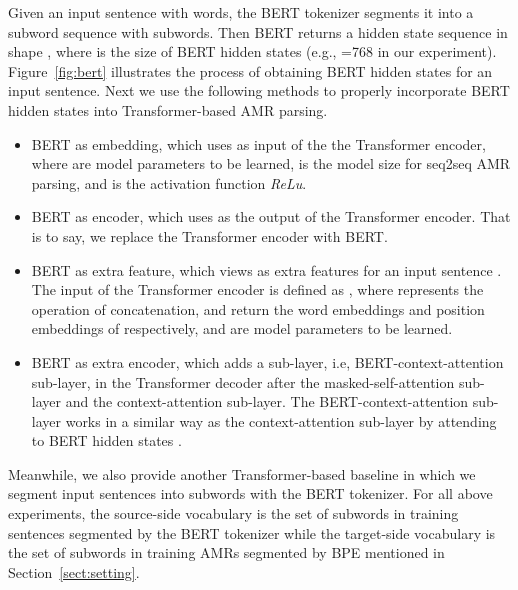 \documentclass[11pt,a4paper]{article}
\begin{document}
Given an input sentence  with  words, the BERT tokenizer segments it into a subword sequence  with  subwords. Then BERT returns a hidden state sequence  in shape , where  is the size of BERT hidden states (e.g., =768 in our experiment). Figure~\ref{fig:bert} illustrates the process of obtaining BERT hidden states for an input sentence. Next we use the following methods to properly incorporate BERT hidden states  into Transformer-based AMR parsing.

\begin{itemize}\item BERT as embedding, which uses  as input of the the Transformer encoder, where  are model parameters to be learned,  is the model size for seq2seq AMR parsing, and  is the activation function \textit{ReLu}.
\item BERT as encoder, which uses  as the output of the Transformer encoder. That is to say, we replace the Transformer encoder with BERT. 
\item BERT as extra feature, which views  as extra features for an input sentence . The input of the Transformer encoder is defined as , where  represents the operation of concatenation,  and  return the word embeddings and position embeddings of  respectively, and  are model parameters to be learned.
\item BERT as extra encoder, which adds a sub-layer, i.e, BERT-context-attention sub-layer, in the Transformer decoder after the masked-self-attention sub-layer and the context-attention sub-layer. The BERT-context-attention sub-layer works in a similar way as the context-attention sub-layer by attending to BERT hidden states .
\end{itemize}

Meanwhile, we also provide another Transformer-based baseline in which we segment input sentences into subwords with the BERT tokenizer. For all above experiments, the source-side vocabulary is the set of subwords in training sentences segmented by the BERT tokenizer while the target-side vocabulary is the set of subwords in training AMRs segmented by BPE mentioned in Section~\ref{sect:setting}.  
\end{document}
